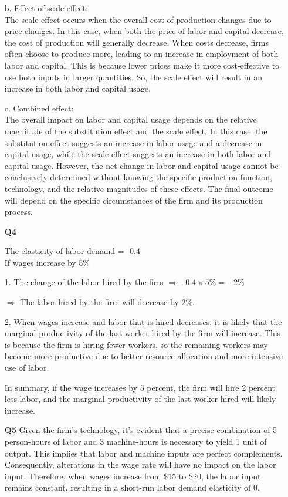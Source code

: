 \documentclass[12pt]{article}
\begin{document}
\begin{enumerate}
    b.  Effect of scale effect:\\
    The scale effect occurs when the overall cost of production changes due to price changes. In this case, when both the price of labor and capital decrease, the cost of production will generally decrease. When costs decrease, firms often choose to produce more, leading to an increase in employment of both labor and capital. This is because lower prices make it more cost-effective to use both inputs in larger quantities. So, the scale effect will result in an increase in both labor and capital usage.
    
    c.  Combined effect:\\
    The overall impact on labor and capital usage depends on the relative magnitude of the substitution effect and the scale effect. In this case, the substitution effect suggests an increase in labor usage and a decrease in capital usage, while the scale effect suggests an increase in both labor and capital usage. However, the net change in labor and capital usage cannot be conclusively determined without knowing the specific production function, technology, and the relative magnitudes of these effects. The final outcome will depend on the specific circumstances of the firm and its production process.\newpage
    
    \item[\textbf{Q4}] 

    The elasticity of labor demand = -0.4\\
    If wages increase by 5\%
    
    1. The change of the labor hired by the firm $\Rightarrow -0.4 \times 5\% = -2\%$
    
    
    $\Rightarrow$ The labor hired by the firm will decrease by $2\%$.

    2. When wages increase and labor that is hired decreases, it is likely that the marginal productivity of the last worker hired by the firm will increase. This is because the firm is hiring fewer workers, so the remaining workers may become more productive due to better resource allocation and more intensive use of labor.

    In summary, if the wage increases by 5 percent, the firm will hire 2 percent less labor, and the marginal productivity of the last worker hired will likely increase.

    \item[\textbf{Q5}] 
    Given the firm's technology, it's evident that a precise combination of 5 person-hours of labor and 3 machine-hours is necessary to yield 1 unit of output. This implies that labor and machine inputs are perfect complements. Consequently, alterations in the wage rate will have no impact on the labor input. Therefore, when wages increase from \$15 to \$20, the labor input remains constant, resulting in a short-run labor demand elasticity of 0.
    

\end{enumerate}
\end{document}
